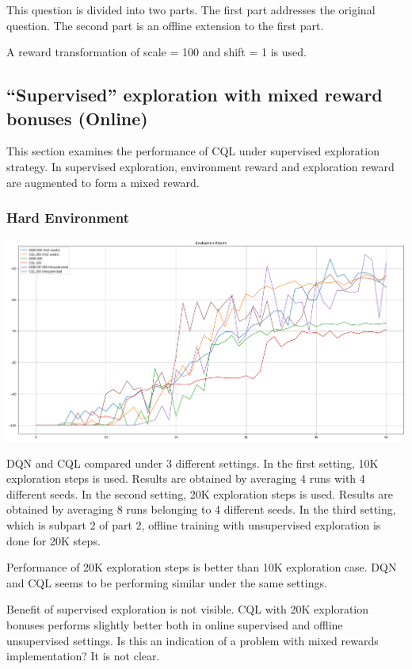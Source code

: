 \documentclass[11pt]{article}
\begin{document}
    This question is divided into two parts.
    The first part addresses the original question.
    The second part is an offline extension to the first part.

    A reward transformation of scale = 100 and shift = 1 is used.


    \subsection{“Supervised” exploration with mixed reward bonuses (Online)}

    This section examines the performance of CQL under supervised exploration strategy.
    In supervised exploration, environment reward and exploration reward are augmented to form a mixed reward.

    \subsubsection{Hard Environment}

    \hspace*{-0.3in}
    \includegraphics[scale=0.30]{q3-online/hard-eval}

    DQN and CQL compared under 3 different settings.
    In the first setting, 10K exploration steps is used.
    Results are obtained by averaging 4 runs with 4 different seeds.
    In the second setting, 20K exploration steps is used.
    Results are obtained by averaging 8 runs belonging to 4 different seeds.
    In the third setting, which is subpart 2 of part 2, offline training with unsupervised exploration is done for 20K steps.

    Performance of 20K exploration steps is better than 10K exploration case.
    DQN and CQL seems to be performing similar under the same settings.

    Benefit of supervised exploration is not visible.
    CQL with 20K exploration bonuses performs slightly better both in online supervised and offline unsupervised settings.
    Is this an indication of a problem with mixed rewards implementation?
    It is not clear.
\end{document}

